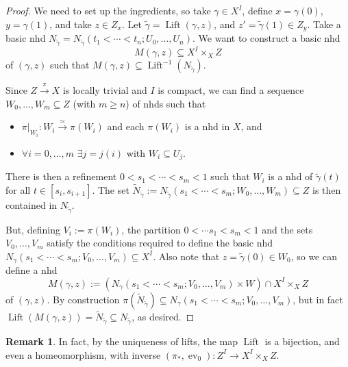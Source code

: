 \documentclass{tufte-handout}
\DeclareMathOperator{\ev}{ev}
\DeclareMathOperator{\Lift}{Lift}
\theoremstyle{definition}
\newtheorem*{rem}{Remark}
\begin{document}
\begin{proof}
We need to set up the ingredients, so take $\gamma \in X^I$, 
define $x=\gamma(0)$, $y=\gamma(1)$, and take $z\in Z_x$.
Let $\widetilde{\gamma} = \Lift(\gamma,z)$, and $z'=\widetilde{\gamma}(1)\in Z_y$.
Take a basic nhd $N_{\widetilde{\gamma}} = N_{\widetilde{\gamma}}(t_1 < \cdots<t_n;U_0,\ldots, U_n)$.
We want to construct a basic nhd
\[
M(\gamma,z) \subseteq X^I \times_X Z
\]
of $(\gamma,z)$ such that $M(\gamma,z) \subseteq \Lift^{-1}(N_{\widetilde{\gamma}})$.

Since $Z\xrightarrow{\pi} X$ is locally trivial and $I$ is compact, we can find a sequence $W_0,\ldots,W_m\subseteq Z$ (with $m\geq n$) of nhds such that
\begin{itemize}
	\item $\pi\big|_{W_i} \colon W_i \xrightarrow{\simeq} \pi(W_i)$ and each $\pi(W_i)$ is a nhd in $X$, and
	\item $\forall i=0,\ldots, m$ $\exists j=j(i)$ with $W_i \subseteq U_j$.
\end{itemize}

There is then a refinement $0<s_1<\cdots<s_m < 1$ such that $W_i$ is a nhd of $\widetilde{\gamma}(t)$ for all $t\in[s_i,s_{i+1}]$.
The set $\widetilde{N}_{\widetilde{\gamma}} := N_{\widetilde{\gamma}}(s_1<\cdots<s_m;W_0,\ldots,W_m) \subseteq Z$ is then contained in $N_{\widetilde{\gamma}}$.

But, defining $V_i := \pi(W_i)$, the partition $0<\cdots s_1 <s_m<1$ and the sets $V_0,\ldots,V_m$ satisfy the conditions required to define the basic nhd $N_\gamma(s_1<\cdots<s_m;V_0,\ldots, V_m)\subseteq X^I$. Also note that $z=\widetilde{\gamma}(0) \in W_0$, so we can define a nhd
\[
M(\gamma,z):= \left(N_\gamma(s_1<\cdots<s_m;V_0,\ldots, V_m)\times W \right) \cap X^I \times_X Z
\]
of $(\gamma,z)$. By construction $\pi(\widetilde{N}_{\widetilde{\gamma}}) \subseteq N_\gamma(s_1<\cdots<s_m;V_0,\ldots, V_m)$, but in fact $\Lift(M(\gamma,z)) = \widetilde{N}_{\widetilde{\gamma}} \subseteq N_{\widetilde{\gamma}}$, as desired.
\end{proof}

\begin{rem}
In fact, by the uniqueness of lifts, the map $\Lift$ is a bijection, and even a homeomorphism, with inverse $(\pi_*,\ev_0)\colon Z^I \to X^I \times _X Z$.
\end{rem}
\end{document}
